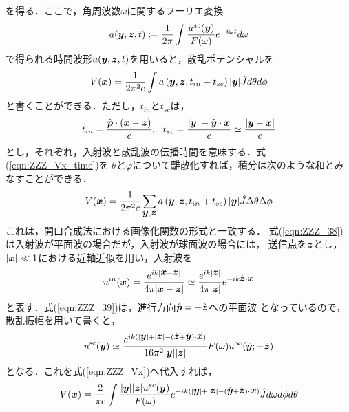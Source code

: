 を得る．ここで，角周波数$\omega$に関するフーリエ変換
\begin{equation}
	a(\mbox{\boldmath $y$},\mbox{\boldmath $z$},t):=\frac{1}{2\pi} \int \frac{u^{sc}(\mbox{\boldmath $y$})}{F(\omega)}e^{-i\omega t}d\omega
	\label{eqn:ZZZ_36}
\end{equation}
で得られる時間波形$a(\mbox{\boldmath $y$},\mbox{\boldmath $z$},t)$を用いると，散乱ポテンシャルを
\begin{equation}
	V(\mbox{\boldmath $x$}) =\frac{1}{2\pi^2c} \int a\left(\mbox{\boldmath $y$}, \mbox{\boldmath $z$}, t_{in}+t_{sc} \right) |\mbox{\boldmath $y$}| \hat{J} d\theta d\phi
	\label{eqn:ZZZ_Vx_time}
\end{equation}
と書くことができる．ただし，$t_{in}$と$t_{sc}$は，
\begin{equation}
	t_{in}=\frac{\hat{\fat{p}}\cdot \left( \fat{x}-\fat{z}\right)}{c}, \ \ 
	t_{sc}=
	\frac{ |\fat{y}|-\hat{\fat{y}}\cdot \fat{x} }{c} \simeq 
	\frac{\left|\fat{y}-\fat{x}\right|}{c} 
	\label{eqn:ZZZ_37}
\end{equation}
とし，それぞれ，入射波と散乱波の伝播時間を意味する．式(\ref{eqn:ZZZ_Vx_time})を
$\theta$と$\varphi$について離散化すれば，積分は次のような和とみなすことができる．
\begin{equation}
	V(\mbox{\boldmath $x$}) = 
	\frac{1}{2\pi^2c} 
	\sum_{\mbox{\boldmath $y$},\mbox{\boldmath $z$}} 
	a\left(\mbox{\boldmath $y$}, \mbox{\boldmath $z$}, t_{in}+t_{sc} \right) 
	|\mbox{\boldmath $y$}| \hat{J} \Delta \theta \Delta \phi
	\label{eqn:ZZZ_38}
\end{equation}
これは，開口合成法における画像化関数の形式と一致する．
式(\ref{eqn:ZZZ_38})は入射波が平面波の場合だが，入射波が球面波の場合には，
送信点を$\mbox{\boldmath $z$}$とし，$|\mbox{\boldmath $x$}|\ll 1$における近軸近似を用い，入射波を
\begin{equation}
	u^{in}(\mbox{\boldmath $x$})
	=\frac{e^{ik|\mbox{\boldmath $x$}-\mbox{\boldmath $z$}|}}{4\pi |\mbox{\boldmath $x$}-\mbox{\boldmath $z$}|}
	\simeq 
	\frac{e^{ik|\mbox{\boldmath $z$}|}}{4\pi |\mbox{\boldmath $z$}|}
	e^{-ik\hat{\mbox{\boldmath $z$}}\cdot\mbox{\boldmath $x$}}
	\label{eqn:ZZZ_39}
\end{equation}
と表す．式(\ref{eqn:ZZZ_39})は，進行方向$\hat{\mbox{\boldmath $p$}}=-\hat{\mbox{\boldmath $z$}}$への平面波
となっているので，散乱振幅を用いて書くと，
\begin{equation}
	u^{\rm sc}(\mbox{\boldmath $y$}) \simeq  
	\frac{e^{ik(|\mbox{\boldmath $y$}|+|\mbox{\boldmath $z$}|-(\hat{\mbox{\boldmath $z$}}+\hat{\mbox{\boldmath $y$}})\cdot \mbox{\boldmath $x$})}}{16\pi^2 |\mbox{\boldmath $y$}| |\mbox{\boldmath $z$}|}
	F(\omega)
	u^{\infty}(\hat{\mbox{\boldmath $y$}};-\hat{\mbox{\boldmath $z$}}) 
	\label{eqn:}
\end{equation}
となる．これを式(\ref{eqn:ZZZ_Vx})へ代入すれば，
\begin{equation}
	V(\mbox{\boldmath $x$}) =\frac{2}{\pi c} \int \frac{|\mbox{\boldmath $y$}||\mbox{\boldmath $z$}|u^{sc}(\mbox{\boldmath $y$})}{F(\omega)}
	e^{-ik(|\mbox{\boldmath $y$}|+|\mbox{\boldmath $z$}|-(\hat{\mbox{\boldmath $y$}}+\hat{\mbox{\boldmath $z$}})\cdot\mbox{\boldmath $x$}) }
	\hat{J} d\omega d\phi d\theta	
	\label{eqn:ZZZ_}
\end{equation}
